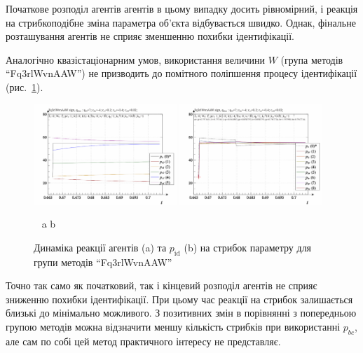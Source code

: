 Початкове розподіл агентів агентів в цьому випадку досить
рівномірний, і реакція на стрибкоподібне зміна параметра об'єкта
відбувається швидко. Однак, фінальне розташування агентів не
сприяє зменшенню похибки ідентифікації.

Аналогічно квазістаціонарним умов, використання величини
$ W $ (група методів ``Fq3rlWvnAAW'') не призводить до помітного
поліпшення процесу ідентифікації (рис.~\ref{atu:f:Fq3rlWvnAAW_sign}).

\begin{figure}[htb!]
  \begin{center}
    \includegraphics[width=0.48\textwidth]{p/sign/qls-p_t_pi_m_Fq3rlWvnAAW_sign.png}
    \hfill
    \includegraphics[width=0.48\textwidth]{p/sign/qls-p_t_p_m_Fq3rlWvnAAW_sign.png}
  \end{center}
  \vspace{-1.0ex}
  \begin{center}
    ~ \hfill a \hfill\hfill b  \hfill ~
  \end{center}
  \vspace{-1.5ex}
  \caption{Динаміка реакції агентів (a) та $p_\mathrm{id}$ (b) на стрибок параметру для групи методів ``Fq3rlWvnAAW''}
  \label{atu:f:Fq3rlWvnAAW_sign}
\end{figure}

Точно так само як початковий, так і кінцевий розподіл агентів не
сприяє зниженню похибки ідентифікації. При цьому час реакції
на стрибок залишається близькі до мінімально можливого. З
позитивних змін в порівнянні з попередньою групою методів
можна відзначити меншу кількість стрибків при використанні
$ p_{bc} $, але сам по собі цей метод практичного інтересу не
представляє.


